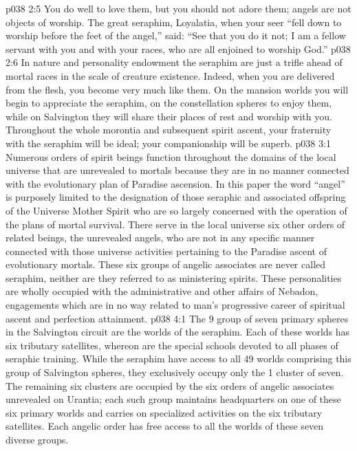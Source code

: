 \vs p038 2:5 \pc You do well to love them, but you should not adore them; angels are not objects of worship. The great seraphim, Loyalatia, when your seer “fell down to worship before the feet of the angel,” said: “See that you do it not; I am a fellow servant with you and with your races, who are all enjoined to worship God.”
\vs p038 2:6 In nature and personality endowment the seraphim are just a trifle ahead of mortal races in the scale of creature existence. Indeed, when you are delivered from the flesh, you become very much like them. On the mansion worlds you will begin to appreciate the seraphim, on the constellation spheres to enjoy them, while on Salvington they will share their places of rest and worship with you. Throughout the whole morontia and subsequent spirit ascent, your fraternity with the seraphim will be ideal; your companionship will be superb.
\vs p038 3:1 Numerous orders of spirit beings function throughout the domains of the local universe that are unrevealed to mortals because they are in no manner connected with the evolutionary plan of Paradise ascension. In this paper the word “angel” is purposely limited to the designation of those seraphic and associated offspring of the Universe Mother Spirit who are so largely concerned with the operation of the plans of mortal survival. There serve in the local universe six other orders of related beings, the unrevealed angels, who are not in any specific manner connected with those universe activities pertaining to the Paradise ascent of evolutionary mortals. These six groups of angelic associates are never called seraphim, neither are they referred to as ministering spirits. These personalities are wholly occupied with the administrative and other affairs of Nebadon, engagements which are in no way related to man’s progressive career of spiritual ascent and perfection attainment.
\vs p038 4:1 The 9 group of seven primary spheres in the Salvington circuit are the worlds of the seraphim. Each of these worlds has six tributary satellites, whereon are the special schools devoted to all phases of seraphic training. While the seraphim have access to all 49 worlds comprising this group of Salvington spheres, they exclusively occupy only the 1 cluster of seven. The remaining six clusters are occupied by the six orders of angelic associates unrevealed on Urantia; each such group maintains headquarters on one of these six primary worlds and carries on specialized activities on the six tributary satellites. Each angelic order has free access to all the worlds of these seven diverse groups.
